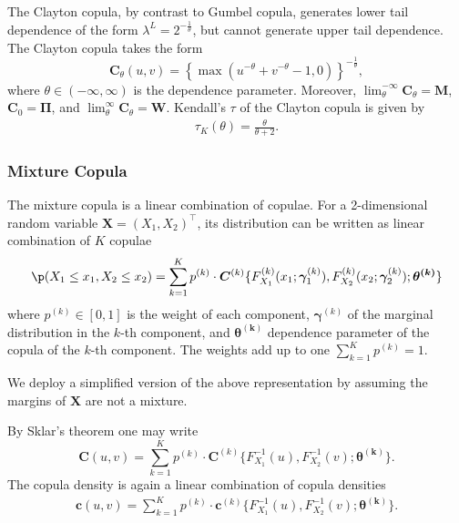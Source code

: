 The Clayton copula, by contrast to Gumbel copula,
generates lower tail dependence of the form $\lambda^L =
2^{-\frac{1}{\theta}}$, but cannot generate upper tail dependence.
The Clayton copula takes the form
\begin{equation*}
  \bm{C}_{\theta}(u,v) = \left\{
    \max(u^{-\theta}+v^{-\theta}-1,0)\right\}^{-\frac{1}{\theta}},
\end{equation*}
where $\theta \in (-\infty, \infty)$ is the dependence parameter.
Moreover, $\lim_\theta^{-\infty} \bm{C}_\theta = \bm{M}$, $\bm{C}_0 =
\bm{\Pi}$, and $\lim_\theta^\infty \bm{C}_\theta = \bm{W}$. 
Kendall's $\tau$ of the Clayton copula is given by 
\begin{align}
    \tau_K(\theta) =\frac{\theta}{\theta+2}.
    \end{align}

\subsubsection{Mixture Copula}\label{sec:mixture-copula}
The mixture copula is a linear combination of copulae. 
For a 2-dimensional random variable $\bm{X}=(X_1,X_2)^\top$,
its distribution can be written as linear combination of $K$ copulae
\begin{equation}
    \p(X_1 \leq x_1, X_2 \leq x_2) = \sum_{k=1}^K p^{(k)} \cdot
    \bm{C}^{(k)}\{F^{(k)}_{X_1}(x_1;\bm{\gamma}^{(k)}_1), 
    F^{(k)}_{X_2}(x_2;\bm{\gamma}^{(k)}_2); \bm{\theta^{(k)}}\}
    \label{eq:2}
    \end{equation}
where $p^{(k)} \in [0,1]$ is the weight of each component,
$\bm{\gamma}^{(k)}$ 
of the marginal distribution in the $k$-th component, 
and $\bm{\theta^{(k)}}$  dependence
parameter of the copula of the $k$-th component. 
The weights add up to one $\sum_{k=1}^K p^{(k)}=1$. \medskip

We deploy a simplified version of the above representation by assuming
the margins of $\bm{X}$ are not a mixture. 


By Sklar's theorem one may write 
\begin{equation*} 
    \bm{C}(u,v)= \sum_{k=1}^K p^{(k)} \cdot \bm{C}^{(k)}\{F^{-1}_{X_1}(u),
    F^{-1}_{X_2}(v); \bm{\theta^{(k)}}\}.
    \end{equation*}
The copula density is again a linear combination of copula densities
\begin{align}
    \bm{c}(u,v)= \sum_{k=1}^K p^{(k)} \cdot \bm{c}^{(k)}\{F^{-1}_{X_1}(u),
    F^{-1}_{X_2}(v); \bm{\theta^{(k)}}\}.
    \end{align}

